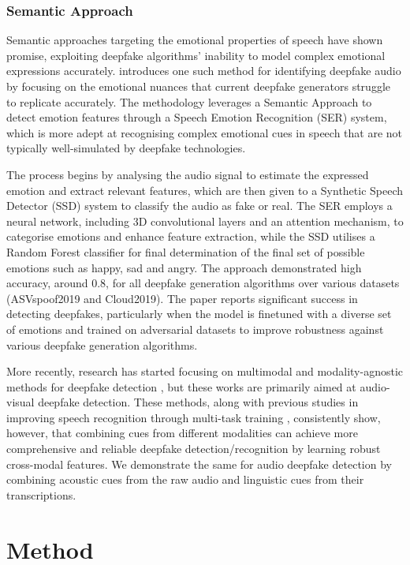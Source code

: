 \documentclass{Interspeech}
\begin{document}
\subsubsection{Semantic Approach}
Semantic approaches targeting the emotional properties of speech have shown
promise, exploiting deepfake algorithms' inability to model complex emotional
expressions accurately. \cite{conti2022deepfake} introduces one such method for
identifying deepfake audio by focusing on the emotional nuances that current
deepfake generators struggle to replicate accurately. The methodology leverages
a Semantic Approach to detect emotion features through a Speech Emotion
Recognition (SER) system, which is more adept at recognising complex emotional
cues in speech that are not typically well-simulated by deepfake technologies.

The process begins by analysing the audio signal to estimate the expressed
emotion and extract relevant features, which are then given to a Synthetic
Speech Detector (SSD) system to classify the audio as fake or real. The SER
employs a neural network, including 3D convolutional layers and an attention
mechanism, to categorise emotions and enhance feature extraction, while the SSD
utilises a Random Forest classifier for final determination of the final set of
possible emotions such as happy, sad and angry. The approach demonstrated high
accuracy, around 0.8, for all deepfake generation algorithms over various
datasets (ASVspoof2019 and Cloud2019). The paper reports significant success in
detecting deepfakes, particularly when the model is finetuned with a diverse
set of emotions and trained on adversarial datasets to improve robustness
against various deepfake generation algorithms.

More recently, research has started focusing on multimodal and
modality-agnostic methods for deepfake detection \cite{av_multimodal,
  multimodal_df_detection, modality_agnostic}, but these works are primarily
aimed at audio-visual deepfake detection. These methods, along with previous
studies in improving speech recognition through multi-task training
\cite{multitask_sr}, consistently show, however, that combining cues from
different modalities can achieve more comprehensive and reliable deepfake
detection/recognition by learning robust cross-modal features. We demonstrate
the same for audio deepfake detection by combining acoustic cues from the raw
audio and linguistic cues from their transcriptions.

\section{Method}
\label{sec:method}
\end{document}
